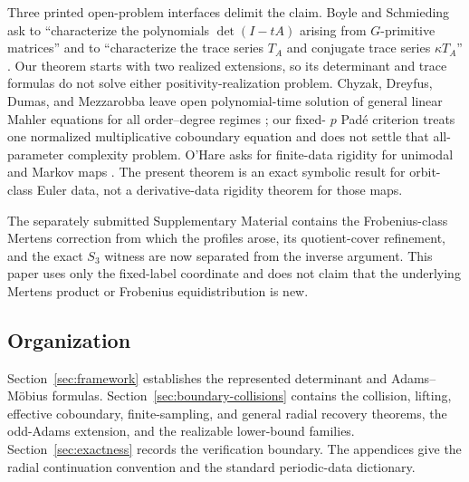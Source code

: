 Three printed open-problem interfaces delimit the claim.  Boyle and
Schmieding ask to ``characterize the polynomials \(\det(I-tA)\) arising from
\(G\)-primitive matrices'' and to ``characterize the trace series \(T_A\) and
conjugate trace series \(\kappa T_A\)''
\cite[Realization Problems~6.1(2)--(3)]{BoyleSchmieding2017FiniteGroupExtensions}.
Our theorem starts with two realized extensions, so its determinant and trace
formulas do not solve either positivity-realization problem.  Chyzak,
Dreyfus, Dumas, and Mezzarobba leave open polynomial-time solution of general
linear Mahler equations for all order--degree regimes
\cite[Sec.~4.3]{ChyzakDreyfusDumasMezzarobba2018MahlerSolutions}; our fixed-
\(p\) Pad\'e criterion treats one normalized multiplicative coboundary equation
and does not settle that all-parameter complexity problem.  O'Hare asks for finite-data rigidity for
unimodal and Markov maps \cite[Introduction]{OHare2025FiniteDataRigidity}.
The present theorem is an exact symbolic result for orbit-class Euler data,
not a derivative-data rigidity theorem for those maps.

The separately submitted Supplementary Material contains the Frobenius-class Mertens correction from which the profiles arose, its
quotient-cover refinement, and the exact \(S_3\) witness are now separated
from the inverse argument.  This paper uses only
the fixed-label coordinate and does not claim that the underlying Mertens
product or Frobenius equidistribution is new.

\subsection{Organization}

Section~\ref{sec:framework} establishes the represented determinant and
Adams--M\"obius formulas.  Section~\ref{sec:boundary-collisions} contains the
collision, lifting, effective coboundary, finite-sampling, and general radial
recovery theorems, the odd-Adams extension, and the realizable lower-bound
families.  Section~\ref{sec:exactness} records the verification
boundary.  The appendices give the radial continuation convention and the
standard periodic-data dictionary.
